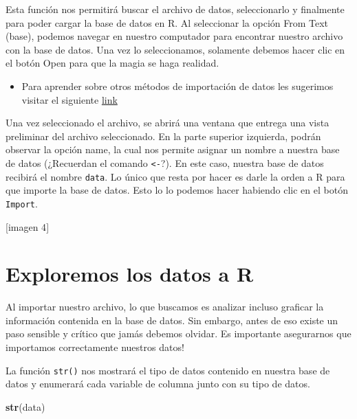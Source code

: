 \documentclass[]{book}
\newenvironment{Shaded}{\begin{snugshade}}{\end{snugshade}}
\newcommand{\KeywordTok}[1]{\textcolor[rgb]{0.13,0.29,0.53}{\textbf{#1}}}
\newcommand{\NormalTok}[1]{#1}
\providecommand{\tightlist}{%
  \setlength{\itemsep}{0pt}\setlength{\parskip}{0pt}}
\begin{document}
Esta función nos permitirá buscar el archivo de datos, seleccionarlo y finalmente para poder cargar la base de
datos en R. Al seleccionar la opción From Text (base), podemos navegar en nuestro computador para
encontrar nuestro archivo con la base de datos. Una vez lo seleccionamos, solamente debemos hacer clic en
el botón Open para que la magia se haga realidad.

\begin{itemize}
\tightlist
\item
  Para aprender sobre otros métodos de importación de datos les sugerimos visitar el siguiente \href{https://thepracticalr.wordpress.com/2016/09/23/importing-data-into-r/}{link}
\end{itemize}

Una vez seleccionado el archivo, se abrirá una ventana que entrega una vista preliminar del archivo
seleccionado. En la parte superior izquierda, podrán observar la opción name, la cual nos permite asignar un
nombre a nuestra base de datos (¿Recuerdan el comando \texttt{\textless{}-}?). En este caso, nuestra base de datos recibirá
el nombre \texttt{data}. Lo único que resta por hacer es darle la orden a R para que importe la base de datos. Esto lo
lo podemos hacer habiendo clic en el botón \texttt{Import}.

{[}imagen 4{]}

\hypertarget{exploremos-los-datos-a-r}{%
\section{Exploremos los datos a R}\label{exploremos-los-datos-a-r}}

Al importar nuestro archivo, lo que buscamos es analizar incluso graficar la información contenida en la
base de datos. Sin embargo, antes de eso existe un paso sensible y crítico que jamás debemos olvidar. Es
importante asegurarnos que importamos correctamente nuestros datos!

La función \texttt{str()} nos mostrará el tipo de datos contenido en nuestra base de datos y enumerará cada variable
de columna junto con su tipo de datos.

\begin{Shaded}
\begin{Highlighting}[]
\KeywordTok{str}\NormalTok{(data)}
\end{Highlighting}
\end{Shaded}
\end{document}
